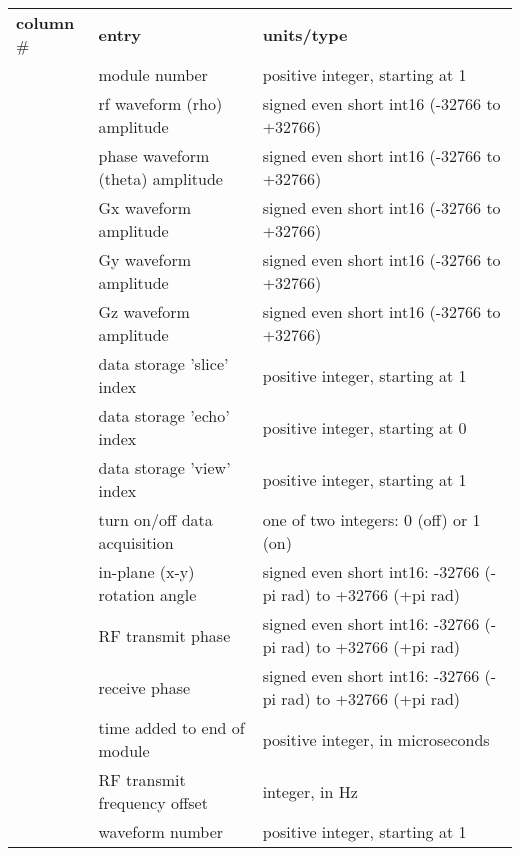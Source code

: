 \begin{tabular}{ l l l}
  \textbf{column} \# & \textbf{entry} & \textbf{units/type} \\
  \modulenum	& module number 								& positive integer, starting at 1 \\
  \rfamp    	& rf waveform (rho) amplitude				& signed even short int16 (-32766 to +32766) \\
  \thetaamp 	& phase waveform (theta) amplitude		& signed even short int16 (-32766 to +32766) \\
  \gxamp			& Gx waveform amplitude						& signed even short int16 (-32766 to +32766) \\
  \gyamp			& Gy waveform amplitude						& signed even short int16 (-32766 to +32766) \\
  \gzamp			& Gz waveform amplitude						& signed even short int16 (-32766 to +32766) \\
  \dabslice		& data storage 'slice' index				& positive integer, starting at 1 \\ 
  \dabecho		& data storage 'echo' index				& positive integer, starting at 0 \\ 
  \dabview		& data storage 'view' index				& positive integer, starting at 1 \\ 
  \dabmode		& turn on/off data acquisition			& one of two integers: 0 (off) or 1 (on) \\
  \inplanerot	& in-plane (x-y) rotation angle			& signed even short int16: -32766 (-pi rad) to +32766 (+pi rad) \\
  \txphase		& RF transmit phase							& signed even short int16: -32766 (-pi rad) to +32766 (+pi rad) \\
  \recphase		& receive phase								& signed even short int16: -32766 (-pi rad) to +32766 (+pi rad) \\
  \textra		& time added to end of module				& positive integer, in microseconds \\
  \rffreq		& RF transmit frequency offset			& integer, in Hz \\
  \waveformnum	& waveform number 							& positive integer, starting at 1
\end{tabular} \\ [0.2in]

